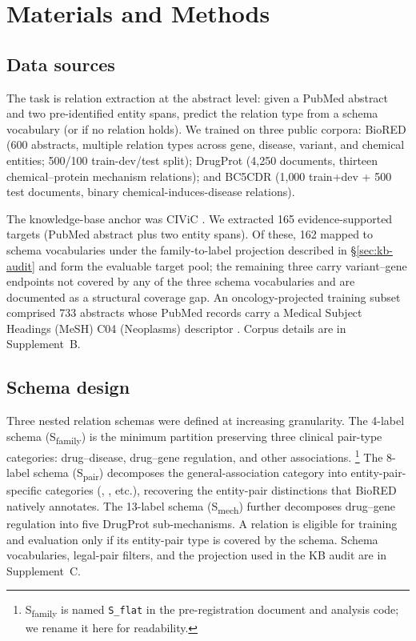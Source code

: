 \section{Materials and Methods}
\label{sec:methods}

\subsection{Data sources}
\label{sec:data}

The task is relation extraction at the abstract level: given a PubMed
abstract and two pre-identified entity spans, predict the relation
type from a schema vocabulary (or  if no
relation holds). We trained on three public corpora: BioRED
\citep{luo2022biored} (600 abstracts, multiple relation types across
gene, disease, variant, and chemical entities; 500/100
train-dev/test split); DrugProt \citep{miranda2023drugprot}
(4{,}250 documents, thirteen chemical--protein mechanism relations);
and BC5CDR \citep{li2016bc5cdr} (1{,}000 train+dev + 500 test
documents, binary chemical-induces-disease relations).

The knowledge-base anchor was CIViC \citep{griffith2017civic}. We
extracted 165 evidence-supported targets (PubMed abstract plus two
entity spans). Of these, 162 mapped to schema vocabularies under
the family-to-label projection described in \S\ref{sec:kb-audit}
and form the evaluable target pool; the remaining three carry
variant--gene endpoints not covered by any of the three schema
vocabularies and are documented as a structural coverage gap. An
oncology-projected training subset comprised 733 abstracts whose
PubMed records carry a Medical Subject Headings (MeSH) C04
(Neoplasms) descriptor \citep{lipscomb2000mesh}. Corpus details are
in Supplement~B.

\subsection{Schema design}
\label{sec:schema}

Three nested relation schemas were defined at increasing granularity.
The 4-label  schema (S\textsubscript{family}) is the
minimum partition preserving three clinical pair-type categories:
drug--disease, drug--gene regulation, and other associations.%
\footnote{S\textsubscript{family} is named \texttt{S\_flat} in the
pre-registration document and analysis code; we rename it here for
readability.} The
8-label  schema (S\textsubscript{pair}) decomposes the general-association category into
entity-pair-specific categories (,
, etc.), recovering the entity-pair
distinctions that BioRED natively annotates. The 13-label
 schema (S\textsubscript{mech}) further decomposes
drug--gene regulation into five DrugProt sub-mechanisms. A relation is eligible for training and evaluation only if its
entity-pair type is covered by the schema. Schema vocabularies,
legal-pair filters, and the projection used in the KB audit are in
Supplement~C.

